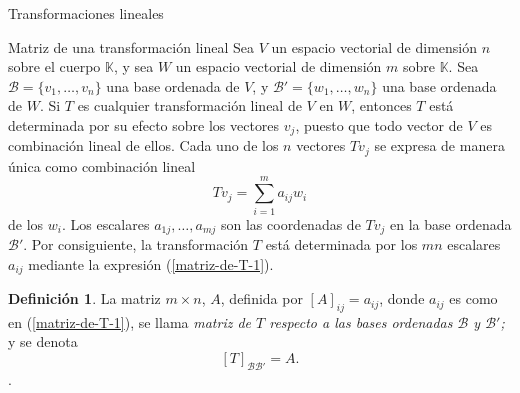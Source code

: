 \documentclass[a4paper,12pt,twoside,spanish,reqno]{amsbook}
\theoremstyle{definition}
\newtheorem{definicion}{Definici\'on}[section]
\theoremstyle{remark}
\newcommand{\K}{\mathbb K}
\begin{document}
\begin{chapter}{Transformaciones lineales}
		\begin{section}{Matriz de una transformación lineal}
			Sea $V$ un espacio vectorial de dimensión $n$ sobre el cuerpo $\K$, y sea $W$ un espacio vectorial de dimensión $m$ sobre $\K$. Sea $\mathcal B = \{v_1,\ldots,v_n\}$ una base ordenada de $V$, y $\mathcal B' = \{w_1,\ldots,w_n\}$ una base ordenada de $W$. Si $T$ es cualquier 		transformación lineal de $V$ en $W$, entonces $T$ está determinada por su efecto sobre los vectores $v_j$, puesto que todo vector de $V$ es combinación lineal de ellos. Cada uno de los $n$ vectores $Tv_j$ se expresa de manera única 	como combinación lineal
			\begin{equation}\label{matriz-de-T-1}
				Tv_j = \sum_{i=1}^{m} a_{ij} w_i
			\end{equation}
			de los $w_i$. Los escalares $a_{1j},\ldots,a_{mj}$ son las coordenadas de $Tv_j$ en la base ordenada $\mathcal B'$. Por consiguiente, la transformación $T$ está determinada por los
			$mn$ escalares $a_{ij}$ mediante la expresión (\ref{matriz-de-T-1}). 
			
			\begin{definicion}
				La matriz $m \times n$, $A$, definida por $[A]_{ij} = a_{ij}$, donde $a_{ij}$  es como en  (\ref{matriz-de-T-1}), se llama \textit{matriz de $T$ respecto a las bases ordenadas $\mathcal B$ y $\mathcal B'$;} y se denota 
				$$
				[T]_{\mathcal B \mathcal B'} = A .
				$$.
			\end{definicion}
			

\end{section}
\end{chapter}
\end{document}
